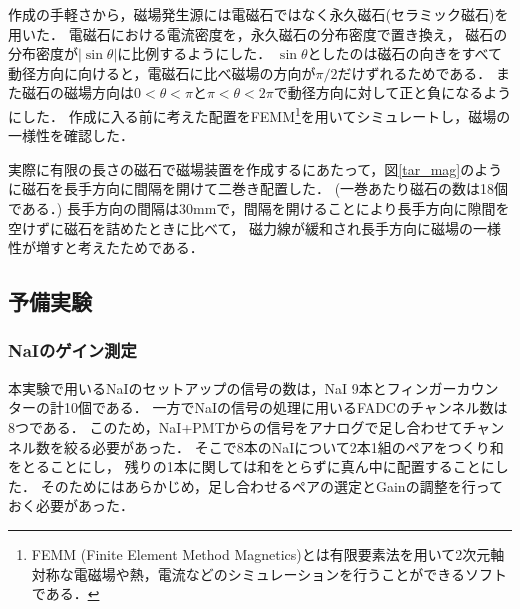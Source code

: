 
作成の手軽さから，磁場発生源には電磁石ではなく永久磁石(セラミック磁石)を用いた．
電磁石における電流密度を，永久磁石の分布密度で置き換え，
磁石の分布密度が$|\sin\theta|$に比例するようにした．
$\sin\theta$としたのは磁石の向きをすべて動径方向に向けると，電磁石に比べ磁場の方向が$\pi/2$だけずれるためである．
また磁石の磁場方向は$0<\theta<\pi$と$\pi<\theta<2\pi$で動径方向に対して正と負になるようにした．
作成に入る前に考えた配置をFEMM\footnote{FEMM (Finite Element Method Magnetics)とは有限要素法を用いて2次元軸対称な電磁場や熱，電流などのシミュレーションを行うことができるソフトである．}を用いてシミュレートし，磁場の一様性を確認した．


実際に有限の長さの磁石で磁場装置を作成するにあたって，図\ref{tar_mag}のように磁石を長手方向に間隔を開けて二巻き配置した．
(一巻あたり磁石の数は18個である．)
長手方向の間隔は$30\mathrm{mm}$で，間隔を開けることにより長手方向に隙間を空けずに磁石を詰めたときに比べて，
磁力線が緩和され長手方向に磁場の一様性が増すと考えたためである．

\newpage
\subsection{予備実験}

\subsubsection{NaIのゲイン測定}
本実験で用いるNaIのセットアップの信号の数は，NaI 9本とフィンガーカウンターの計10個である．
一方でNaIの信号の処理に用いるFADCのチャンネル数は8つである．
このため，NaI+PMTからの信号をアナログで足し合わせてチャンネル数を絞る必要があった．
そこで8本のNaIについて2本1組のペアをつくり和をとることにし，
残りの1本に関しては和をとらずに真ん中に配置することにした．
そのためにはあらかじめ，足し合わせるペアの選定とGainの調整を行っておく必要があった．

